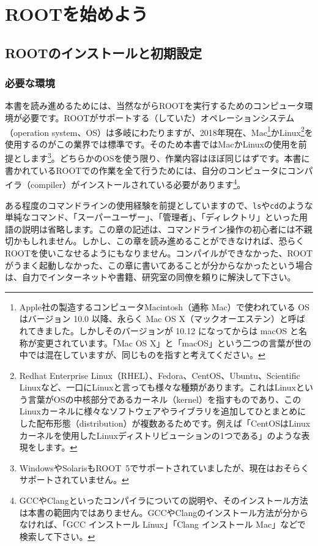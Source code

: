 \chapter{ROOTを始めよう}
\label{chap:Install}
\section{ROOTのインストールと初期設定}
\label{sec:ROOT_install}
\subsection{必要な環境}
本書を読み進めるためには、当然ながらROOTを実行するためのコンピュータ環境が必要です。ROOTがサポートする（していた）オペレーションシステム（operation system、OS）は多岐にわたりますが、2018年現在、Mac\footnote{Apple社の製造するコンピュータMacintosh（通称 Mac）で使われている OS はバージョン 10.0 以降、永らく Mac OS X（マックオーエステン）と呼ばれてきました。しかしそのバージョンが 10.12 になってからは macOS と名称が変更されています。「Mac OS X」と「macOS」という二つの言葉が世の中では混在していますが、同じものを指すと考えてください。}かLinux\footnote{Redhat Enterprise Linux（RHEL）、Fedora、CentOS、Ubuntu、Scientific Linuxなど、一口にLinuxと言っても様々な種類があります。これはLinuxという言葉がOSの中核部分であるカーネル（kernel）を指すものであり、このLinuxカーネルに様々なソフトウェアやライブラリを追加してひとまとめにした配布形態（distribution）が複数あるためです。例えば「CentOSはLinuxカーネルを使用したLinuxディストリビューションの1つである」のような表現をします。}を使用するのがこの業界では標準です。そのため本書ではMacかLinuxの使用を前提とします\footnote{WindowsやSolarisもROOT~5でサポートされていましたが、現在はおそらくサポートされていません。}。どちらかのOSを使う限り、作業内容はほぼ同じはずです。本書に書かれているROOTでの作業を全て行うためには、自分のコンピュータにコンパイラ（compiler）がインストールされている必要があります\footnote{GCCやClangといったコンパイラについての説明や、そのインストール方法は本書の範囲内ではありません。GCCやClangのインストール方法が分からなければ、「GCC インストール Linux」「Clang インストール Mac」などで検索して下さい。}。

ある程度のコマンドラインの使用経験を前提としていますので、\texttt{ls}や\texttt{cd}のような単純なコマンド、「スーパーユーザー」、「管理者」、「ディレクトリ」といった用語の説明は省略します。この章の記述は、コマンドライン操作の初心者には不親切かもしれません。しかし、この章を読み進めることができなければ、恐らくROOTを使いこなせるようにもなりません。コンパイルができなかった、ROOTがうまく起動しなかった、この章に書いてあることが分からなかったという場合は、自力でインターネットや書籍、研究室の同僚を頼りに解決して下さい。

